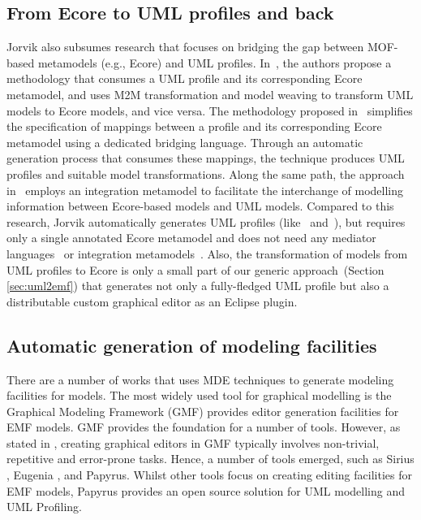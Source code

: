 \subsection{From Ecore to UML profiles and back}
Jorvik also subsumes research that focuses on bridging the gap between MOF-based metamodels (e.g., Ecore) and UML profiles.
In~\cite{abouzahra2005practical}, the authors propose a methodology that consumes a UML profile and its corresponding Ecore metamodel, and uses M2M transformation and model weaving to transform UML models to Ecore models, and vice versa. 
The methodology proposed in~\cite{Wimmer2009:IJWIS} simplifies the specification of mappings between a profile and its corresponding Ecore metamodel using a dedicated 
bridging language. 
Through an automatic generation process that consumes these mappings, the technique produces UML profiles and suitable model transformations. 
Along the same path, the approach in~\cite{Giachetti2009:ICRCIS} employs an integration metamodel to facilitate the interchange of modelling information between Ecore-based models and UML models. 
Compared to this research, Jorvik automatically generates UML profiles (like~\cite{Wimmer2009:IJWIS} and~\cite{Giachetti2009:ICRCIS}), but requires only a single annotated Ecore metamodel and does not need any mediator languages~\cite{Wimmer2009:IJWIS} or integration metamodels~\cite{Giachetti2009:ICRCIS}. 
Also, the transformation of models from UML profiles to Ecore is only a small part of our generic approach~(Section \ref{sec:uml2emf}) that generates not only a fully-fledged UML profile but also a distributable custom graphical editor as an Eclipse plugin. 

\subsection{Automatic generation of modeling facilities}
There are a number of works that uses MDE techniques to generate modeling facilities for models. 
The most widely used tool for graphical modelling is the Graphical Modeling Framework \cite{eclipseGMP} (GMF) provides editor generation facilities for EMF models. 
GMF provides the foundation for a number of tools. 
However, as stated in \cite{kolovos2015eugenia}, creating graphical editors in GMF typically involves non-trivial, repetitive and error-prone tasks.
Hence, a number of tools emerged, such as Sirius \cite{viyovic2014sirius}, Eugenia \cite{kolovos2015eugenia}, and Papyrus.
Whilst other tools focus on creating editing facilities for EMF models, Papyrus provides an open source solution for UML modelling and UML Profiling.


